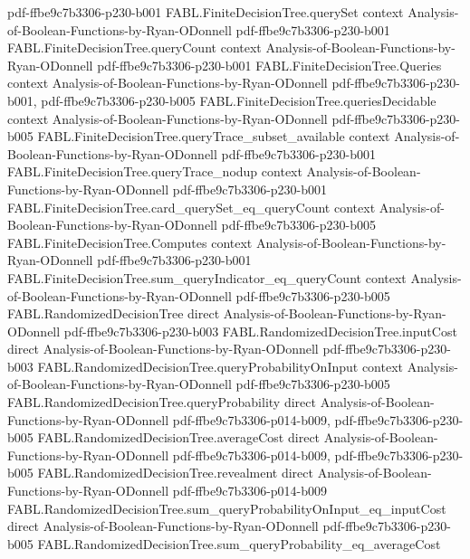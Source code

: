 \begin{theorem}
  {pdf-ffbe9c7b3306-p230-b001}
\proofstep
  {FABL.FiniteDecisionTree.querySet}
  {context}
  {Analysis-of-Boolean-Functions-by-Ryan-ODonnell}
  {pdf-ffbe9c7b3306-p230-b001}
\proofstep
  {FABL.FiniteDecisionTree.queryCount}
  {context}
  {Analysis-of-Boolean-Functions-by-Ryan-ODonnell}
  {pdf-ffbe9c7b3306-p230-b001}
\proofstep
  {FABL.FiniteDecisionTree.Queries}
  {context}
  {Analysis-of-Boolean-Functions-by-Ryan-ODonnell}
  {pdf-ffbe9c7b3306-p230-b001,
    pdf-ffbe9c7b3306-p230-b005}
\proofstep
  {FABL.FiniteDecisionTree.queriesDecidable}
  {context}
  {Analysis-of-Boolean-Functions-by-Ryan-ODonnell}
  {pdf-ffbe9c7b3306-p230-b005}
\proofstep
  {FABL.FiniteDecisionTree.queryTrace_subset_available}
  {context}
  {Analysis-of-Boolean-Functions-by-Ryan-ODonnell}
  {pdf-ffbe9c7b3306-p230-b001}
\proofstep
  {FABL.FiniteDecisionTree.queryTrace_nodup}
  {context}
  {Analysis-of-Boolean-Functions-by-Ryan-ODonnell}
  {pdf-ffbe9c7b3306-p230-b001}
\proofstep
  {FABL.FiniteDecisionTree.card_querySet_eq_queryCount}
  {context}
  {Analysis-of-Boolean-Functions-by-Ryan-ODonnell}
  {pdf-ffbe9c7b3306-p230-b005}
\proofstep
  {FABL.FiniteDecisionTree.Computes}
  {context}
  {Analysis-of-Boolean-Functions-by-Ryan-ODonnell}
  {pdf-ffbe9c7b3306-p230-b001}
\proofstep
  {FABL.FiniteDecisionTree.sum_queryIndicator_eq_queryCount}
  {context}
  {Analysis-of-Boolean-Functions-by-Ryan-ODonnell}
  {pdf-ffbe9c7b3306-p230-b005}
\proofstep
  {FABL.RandomizedDecisionTree}
  {direct}
  {Analysis-of-Boolean-Functions-by-Ryan-ODonnell}
  {pdf-ffbe9c7b3306-p230-b003}
\proofstep
  {FABL.RandomizedDecisionTree.inputCost}
  {direct}
  {Analysis-of-Boolean-Functions-by-Ryan-ODonnell}
  {pdf-ffbe9c7b3306-p230-b003}
\proofstep
  {FABL.RandomizedDecisionTree.queryProbabilityOnInput}
  {context}
  {Analysis-of-Boolean-Functions-by-Ryan-ODonnell}
  {pdf-ffbe9c7b3306-p230-b005}
\proofstep
  {FABL.RandomizedDecisionTree.queryProbability}
  {direct}
  {Analysis-of-Boolean-Functions-by-Ryan-ODonnell}
  {pdf-ffbe9c7b3306-p014-b009,
    pdf-ffbe9c7b3306-p230-b005}
\proofstep
  {FABL.RandomizedDecisionTree.averageCost}
  {direct}
  {Analysis-of-Boolean-Functions-by-Ryan-ODonnell}
  {pdf-ffbe9c7b3306-p014-b009,
    pdf-ffbe9c7b3306-p230-b005}
\proofstep
  {FABL.RandomizedDecisionTree.revealment}
  {direct}
  {Analysis-of-Boolean-Functions-by-Ryan-ODonnell}
  {pdf-ffbe9c7b3306-p014-b009}
\proofstep
  {FABL.RandomizedDecisionTree.sum_queryProbabilityOnInput_eq_inputCost}
  {direct}
  {Analysis-of-Boolean-Functions-by-Ryan-ODonnell}
  {pdf-ffbe9c7b3306-p230-b005}
\proofstep
  {FABL.RandomizedDecisionTree.sum_queryProbability_eq_averageCost}

\end{theorem}
